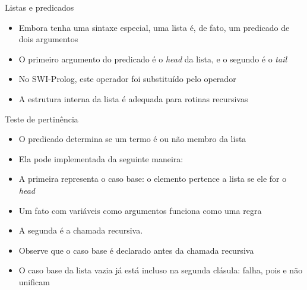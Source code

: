 \begin{frame}[fragile]{Listas e predicados}

    \begin{itemize}
        \item Embora tenha uma sintaxe especial, uma lista é, de fato, um predicado de dois 
            argumentos

        \item O primeiro argumento do predicado  é o \textit{head} da lista, 
            e o segundo é o \textit{tail}

        \item No SWI-Prolog, este operador foi substituído pelo operador


        \item A estrutura interna da lista é adequada para rotinas recursivas

    \end{itemize}

\end{frame}

\begin{frame}[fragile]{Teste de pertinência}

    \begin{itemize}
        \item O predicado  determina se um termo é ou não membro da 
            lista

        \item Ela pode implementada da seguinte maneira:


        \item A primeira representa o caso base: o elemento pertence a lista se ele for o 
            \textit{head}

        \item Um fato com variáveis como argumentos funciona como uma regra

        \item A segunda é a chamada recursiva.

        \item Observe que o caso base é declarado antes da chamada recursiva

        \item O caso base da lista vazia já está incluso na segunda clásula: 
             falha, pois  e 
             não unificam

    \end{itemize}

\end{frame}


